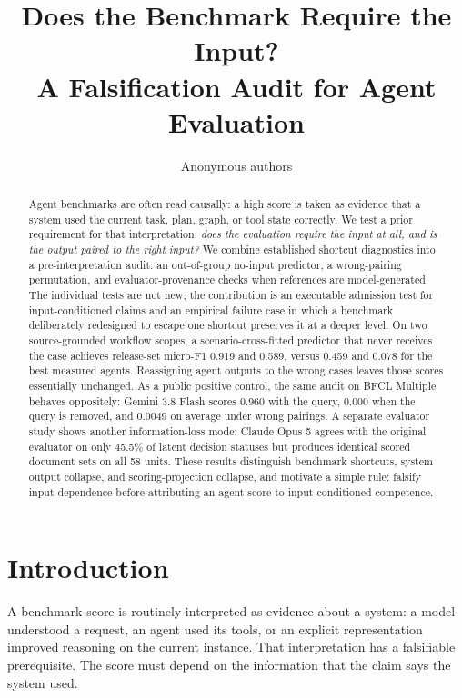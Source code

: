 \documentclass{article}
\title{Does the Benchmark Require the Input?\\A Falsification Audit for Agent Evaluation}
\author{Anonymous authors}
\begin{document}
\maketitle
\begin{abstract}
Agent benchmarks are often read causally: a high score is taken as evidence that a system used the current task, plan, graph, or tool state correctly. We test a prior requirement for that interpretation: \emph{does the evaluation require the input at all, and is the output paired to the right input?} We combine established shortcut diagnostics into a pre-interpretation audit: an out-of-group no-input predictor, a wrong-pairing permutation, and evaluator-provenance checks when references are model-generated. The individual tests are not new; the contribution is an executable admission test for input-conditioned claims and an empirical failure case in which a benchmark deliberately redesigned to escape one shortcut preserves it at a deeper level. On two source-grounded workflow scopes, a scenario-cross-fitted predictor that never receives the case achieves release-set micro-F1 0.919 and 0.589, versus 0.459 and 0.078 for the best measured agents. Reassigning agent outputs to the wrong cases leaves those scores essentially unchanged. As a public positive control, the same audit on BFCL Multiple behaves oppositely: Gemini 3.8 Flash scores 0.960 with the query, 0.000 when the query is removed, and 0.0049 on average under wrong pairings. A separate evaluator study shows another information-loss mode: Claude Opus 5 agrees with the original evaluator on only 45.5\% of latent decision statuses but produces identical scored document sets on all 58 units. These results distinguish benchmark shortcuts, system output collapse, and scoring-projection collapse, and motivate a simple rule: falsify input dependence before attributing an agent score to input-conditioned competence.
\end{abstract}

\section{Introduction}
A benchmark score is routinely interpreted as evidence about a system: a model understood a request, an agent used its tools, or an explicit representation improved reasoning on the current instance. That interpretation has a falsifiable prerequisite. The score must depend on the information that the claim says the system used.
\end{document}
